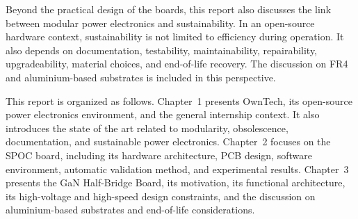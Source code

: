 \vspace{0.4cm}

Beyond the practical design of the boards, this report also discusses the link
between modular power electronics and sustainability. In an open-source
hardware context, sustainability is not limited to efficiency during operation.
It also depends on documentation, testability, maintainability, repairability,
upgradeability, material choices, and end-of-life recovery. The discussion on
FR4 and aluminium-based substrates is included in this perspective.

\vspace{0.4cm}

This report is organized as follows. Chapter~1 presents OwnTech, its
open-source power electronics environment, and the general internship context.
It also introduces the state of the art related to modularity, obsolescence,
documentation, and sustainable power electronics. Chapter~2 focuses on the SPOC
board, including its hardware architecture, PCB design, software environment,
automatic validation method, and experimental results. Chapter~3 presents the
GaN Half-Bridge Board, its motivation, its functional architecture, its
high-voltage and high-speed design constraints, and the discussion on
aluminium-based substrates and end-of-life considerations.